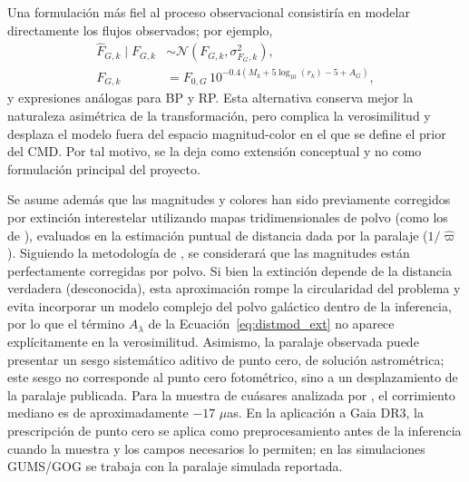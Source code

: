 \documentclass[stu, 12pt, letterpaper, donotrepeattitle, floatsintext, natbib]{apa7_ula}
\begin{document}
Una formulación más fiel al proceso observacional consistiría en
modelar directamente los flujos observados; por ejemplo,
\begin{align}
    \hat{F}_{G,k} \mid F_{G,k} &\sim
        \mathcal{N}(F_{G,k}, \sigma_{F_G,k}^2), \\
    F_{G,k} &= F_{0,G}\, 10^{-0.4\left(M_k + 5\log_{10}(r_k) - 5 + A_G\right)},
        \label{eq:flux_likelihood_g}
\end{align}
y expresiones análogas para BP y RP. Esta alternativa conserva mejor la
naturaleza asimétrica de la transformación, pero complica la
verosimilitud y desplaza el modelo fuera del espacio magnitud-color en
el que se define el prior del CMD. Por tal motivo, se la deja como
extensión conceptual y no como formulación principal del proyecto.

Se asume además que las magnitudes y colores han sido previamente
corregidos por extinción interestelar utilizando mapas tridimensionales
de polvo (como los de \citealt{edenhofer2023parsecscale}), evaluados
en la estimación puntual de distancia dada por la paralaje ($1/\hat{\varpi}$).
Siguiendo la metodología de \citet{Leistedt_2017}, se considerará que las
magnitudes están perfectamente corregidas por polvo. Si bien la extinción
depende de la distancia verdadera (desconocida), esta aproximación rompe
la circularidad del problema y evita incorporar un modelo complejo del polvo
galáctico dentro de la inferencia, por lo que el término
$A_\lambda$ de la Ecuación~\ref{eq:distmod_ext} no aparece
explícitamente en la verosimilitud. Asimismo, la paralaje observada
puede presentar un sesgo sistemático aditivo de punto cero,
de solución astrométrica; este sesgo no corresponde al punto cero
fotométrico, sino a un desplazamiento de la paralaje publicada. Para
la muestra de cuásares analizada por \citet{Lindegren_2021}, el
corrimiento mediano es de aproximadamente $-17$ $\mu$as. En la
aplicación a Gaia DR3, la prescripción de punto cero se aplica como
preprocesamiento antes de la inferencia cuando la muestra y los
campos necesarios lo permiten; en las simulaciones GUMS/GOG se trabaja
con la paralaje simulada reportada.
\end{document}
